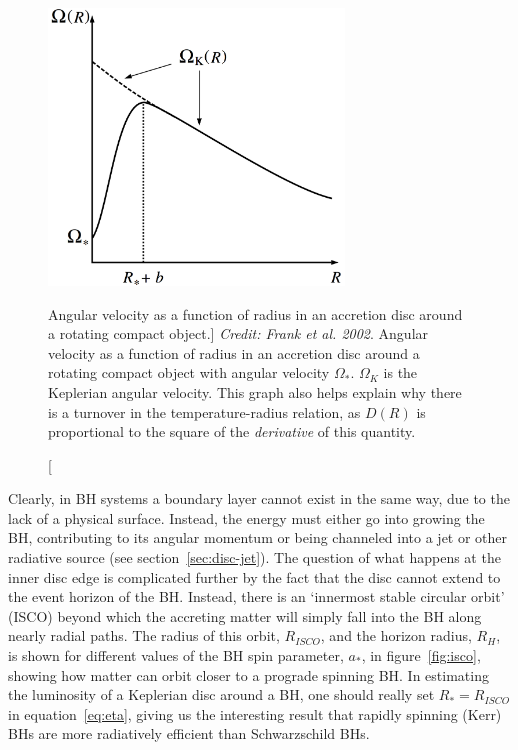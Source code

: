 \begin{figure}
\centering
\includegraphics[width=0.7\textwidth]{figures/01-intro/omega.png}
\caption
[Angular velocity as a function of radius in an accretion disc around a rotating
compact object.]
{
{\sl Credit: Frank et al. 2002}.
Angular velocity as a function of radius in an accretion disc around a rotating
compact object with angular velocity $\Omega_*$. $\Omega_K$ is the Keplerian 
angular velocity. This graph
also helps explain why there is a turnover in the temperature-radius relation,
as $D(R)$ is proportional to the square of the {\em derivative} of this quantity.
} 
\label{fig:omega}
\end{figure}

Clearly, in BH systems a boundary layer cannot exist in the same way,
due to the lack of a physical surface. Instead, the energy must either go into
growing the BH, contributing to its angular momentum or being
channeled into a jet or other radiative source (see section~\ref{sec:disc-jet}).
The question of what happens at the inner disc edge
is complicated further by the fact that the disc cannot extend to the 
event horizon of the BH. Instead, there is an `innermost stable circular orbit' (ISCO)
beyond which the accreting matter will simply fall 
into the BH along nearly radial paths. The radius
of this orbit, $R_{ISCO}$, and the horizon radius, $R_H$,
is shown for different values of the BH spin parameter, $a_*$, 
in figure~\ref{fig:isco}, showing how matter can orbit closer to a prograde spinning BH. 
In estimating the luminosity of a Keplerian disc around a BH, 
one should really set $R_* = R_{ISCO}$ in equation~\ref{eq:eta}, giving us the interesting
result that rapidly spinning (Kerr) BHs are more radiatively efficient 
than Schwarzschild BHs.

